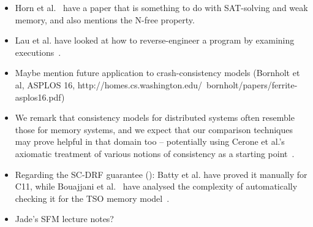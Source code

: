\begin{itemize}

\item Horn et al.~\cite{horn+15} have a paper that is something to do
with SAT-solving and weak memory, and also mentions the N-free
property.

\item Lau et al. have looked at how to reverse-engineer a program
by examining executions~\cite{lau+03}.

\item Maybe mention future application to crash-consistency models
(Bornholt et al, ASPLOS 16, http://homes.cs.washington.edu/~bornholt/papers/ferrite-asplos16.pdf)

\item We remark that consistency models for distributed systems often
resemble those for memory systems, and we expect that our comparison
techniques may prove helpful in that domain too -- potentially using
Cerone et al.'s axiomatic treatment of various notions of consistency
as a starting point~\cite{cerone+15}.

\item Regarding the SC-DRF guarantee (): Batty et al. have proved it
manually for C11, while Bouajjani et al.~\cite{bouajjani+11} have
analysed the complexity of automatically checking it for the TSO
memory model~\cite{owens+09}.

\item Jade's SFM lecture notes?~\cite{alglave15}

\end{itemize}